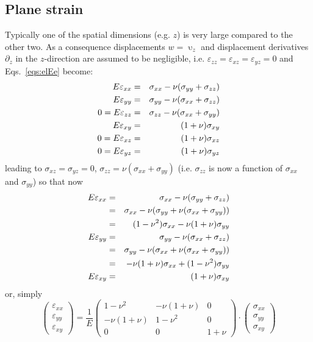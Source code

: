\newpage
\subsection{Plane strain \label{ss:elpstrain}}
Typically one of the spatial dimensions (e.g. $z$) 
is very large compared to the other two. 
As a consequence displacements $w=\upupsilon_z$ and 
displacement derivatives $\partial_z$ in the 
$z$-direction are assumed to be negligible, i.e. $\varepsilon_{zz}=\varepsilon_{xz}=\varepsilon_{yz}=0$
and Eqs.~\eqref{eqs:elEe} become:
\begin{eqnarray}
  E \varepsilon_{xx} &=&  \sigma_{xx} - \nu (\sigma_{yy}+\sigma_{zz}) \nonumber\\
  E \varepsilon_{yy} &=&  \sigma_{yy} - \nu (\sigma_{xx}+\sigma_{zz}) \nonumber\\
0=E \varepsilon_{zz} &=&  \sigma_{zz} - \nu (\sigma_{xx}+\sigma_{yy}) \nonumber\\
  E \varepsilon_{xy} &=&  (1+\nu) \sigma_{xy} \nonumber\\
0=E \varepsilon_{xz} &=&  (1+\nu) \sigma_{xz} \nonumber\\
0=E \varepsilon_{yz} &=&  (1+\nu) \sigma_{yz} \nonumber 
\end{eqnarray}
leading to $\sigma_{xz}=\sigma_{yz}=0$, $\sigma_{zz}=\nu(\sigma_{xx}+\sigma_{yy})$
(i.e. $\sigma_{zz}$ is now a function of $\sigma_{xx}$ and $\sigma_{yy}$) so that now
\begin{eqnarray}
E \varepsilon_{xx} 
&=&  \sigma_{xx} - \nu (\sigma_{yy}+\sigma_{zz}) \nonumber\\
&=&  \sigma_{xx} - \nu (\sigma_{yy}+ \nu(\sigma_{xx}+\sigma_{yy})) \nonumber\\
&=& (1-\nu^2) \sigma_{xx} - \nu (1+\nu ) \sigma_{yy} \nonumber\\
E \varepsilon_{yy} 
&=&  \sigma_{yy} - \nu (\sigma_{xx}+\sigma_{zz}) \nonumber\\
&=&  \sigma_{yy} - \nu (\sigma_{xx}+ \nu(\sigma_{xx}+\sigma_{yy})) \nonumber\\
&=& -\nu(1+\nu) \sigma_{xx} + (1-\nu^2) \sigma_{yy} \nonumber\\
E \varepsilon_{xy} &=&  (1+\nu) \sigma_{xy} \nonumber
\end{eqnarray}
or, simply
\begin{equation}
\left(
\begin{array}{c}
\varepsilon_{xx}\\
\varepsilon_{yy}\\
\varepsilon_{xy}
\end{array}
\right)
=\frac1E
\left(
\begin{array}{ccc}
1-\nu^2 & -\nu(1+\nu) & 0 \\
-\nu(1+\nu) & 1-\nu^2 & 0 \\
0 & 0 & 1+\nu
\end{array}
\right)
\cdot
\left(
\begin{array}{c}
\sigma_{xx}\\
\sigma_{yy}\\
\sigma_{xy}
\end{array}
\right)
\end{equation}
